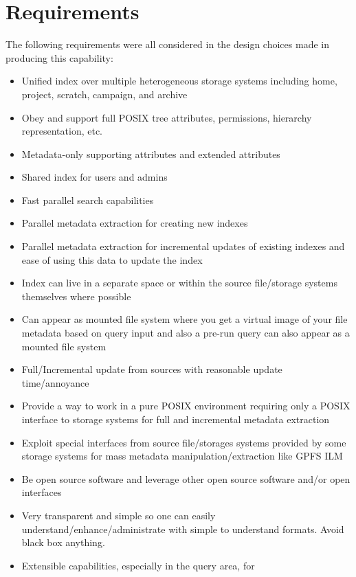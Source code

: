 \section{Requirements}
The following requirements were all considered in the design choices
made in producing this capability:

\begin{itemize}
\item Unified index over multiple heterogeneous storage systems
  including home, project, scratch, campaign, and archive
\item Obey and support full POSIX tree attributes, permissions,
  hierarchy representation, etc.
\item Metadata-only supporting attributes and extended attributes
\item Shared index for users and admins
\item Fast parallel search capabilities
\item Parallel metadata extraction for creating new indexes
\item Parallel metadata extraction for incremental updates of existing
  indexes and ease of using this data to update the index
\item Index can live in a separate space or within the source
  file/storage systems themselves where possible
\item Can appear as mounted file system where you get a virtual image
  of your file metadata based on query input and also a pre-run query
  can also appear as a mounted file system
\item Full/Incremental update from sources with reasonable update \\
  time/annoyance
\item Provide a way to work in a pure POSIX environment requiring only
  a POSIX interface to storage systems for full and incremental
  metadata extraction
\item Exploit special interfaces from source file/storages systems
  provided by some storage systems for mass metadata
  manipulation/extraction like GPFS ILM
\item Be open source software and leverage other open source software
  and/or open interfaces
\item Very transparent and simple so one can easily \\
  understand/enhance/administrate with simple to understand formats.
  Avoid black box anything.
\item Extensible capabilities, especially in the query area, for

\end{itemize}
